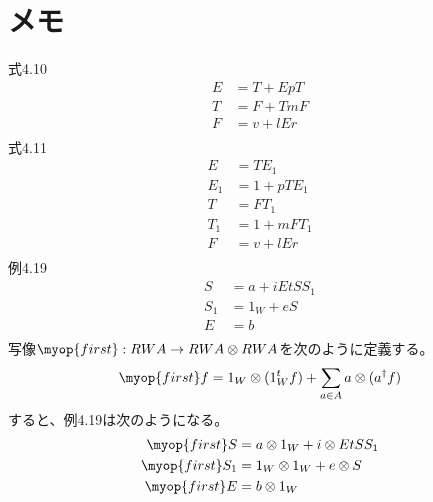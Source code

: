 \section{メモ}\label{s1:メモ} %
	式4.10
	\begin{equation*}\begin{split} %
			E &= T + EpT \\
			T &= F + TmF \\
			F &= v + lEr \\
	\end{split}\end{equation*} %
	式4.11
	\begin{equation*}\begin{split} %
			E &= TE_1 \\
			E_1 &= 1 + pTE_1 \\
			T &= FT_1 \\
			T_1 &= 1 + mFT_1 \\
			F &= v + lEr \\
	\end{split}\end{equation*} %
	例4.19
	\begin{equation*}\begin{split} %
		S &= a + iEtSS_1 \\
		S_1 &= 1_W + eS \\
		E &= b \\
	\end{split}\end{equation*} %
	写像$\myop{first}:RWA\to RWA\otimes RWA$を次のように定義する。
	\begin{equation*}\begin{split} %
		\myop{first}f &= 1_W\otimes (1_W^t f) 
			+ \sum_{a\in A}a\otimes (a^\dag f) \\
	\end{split}\end{equation*} %
	すると、例4.19は次のようになる。
	\begin{equation*}\begin{split} %
		\myop{first}S &= a\otimes 1_W + i\otimes EtSS_1 \\
		\myop{first}S_1 &= 1_W\otimes 1_W + e\otimes S \\
		\myop{first}E &= b\otimes 1_W \\
	\end{split}\end{equation*} %
